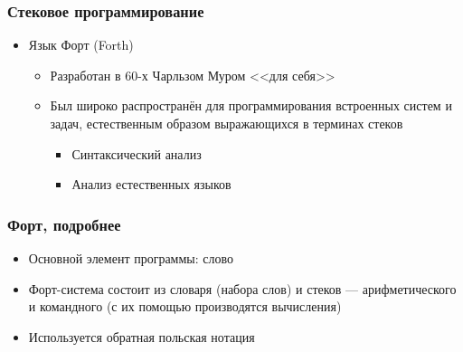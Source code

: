\documentclass[xetex,mathserif,serif]{beamer}
\begin{document}
	\begin{frame}
		\frametitle{Стековое программирование}
		\begin{itemize}
			\item Язык Форт (Forth)
			\begin{itemize}
				\item Разработан в 60-х Чарльзом Муром <<для себя>>
				\item Был широко распространён для программирования встроенных систем и задач, естественным образом выражающихся в терминах стеков
				\begin{itemize}
					\item Синтаксический анализ
					\item Анализ естественных языков
				\end{itemize}
			\end{itemize}
		\end{itemize}
	\end{frame}

	\begin{frame}
		\frametitle{Форт, подробнее}
		\begin{itemize}
			\item Основной элемент программы: слово
			\item Форт-система состоит из словаря (набора слов) и стеков --- арифметического и командного (с их помощью производятся вычисления)
			\item Используется обратная польская нотация
		\end{itemize}
	\end{frame}
\end{document}
